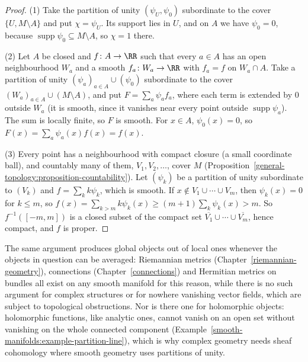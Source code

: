 \begin{proof}
(1) Take the partition of unity $(\psi_U, \psi_0)$ subordinate to the cover $\{U, M \setminus A\}$ and put $\chi = \psi_U$. Its support lies in $U$, and on $A$
we have $\psi_0 = 0$, because $\operatorname{supp}\psi_0 \subseteq M \setminus A$, so $\chi = 1$ there.

(2) Let $A$ be closed and $f \colon A \to \RR$ such that every $a \in A$ has an open neighbourhood $W_a$ and a smooth $f_a \colon W_a \to \RR$ with $f_a = f$ on
$W_a \cap A$. Take a partition of unity $(\psi_a)_{a \in A} \cup (\psi_0)$ subordinate to the cover $(W_a)_{a \in A} \cup (M \setminus A)$, and put
$F = \sum_a\psi_af_a$, where each term is extended by $0$ outside $W_a$ (it is smooth, since it vanishes near every point outside $\operatorname{supp}\psi_a$).
The sum is locally finite, so $F$ is smooth. For $x \in A$, $\psi_0(x) = 0$, so $F(x) = \sum_a\psi_a(x)f(x) = f(x)$.

(3) Every point has a neighbourhood with compact closure (a small coordinate ball), and countably many of them, $V_1, V_2, \ldots$, cover $M$
(Proposition~\ref{general-topology:proposition-countability}). Let $(\psi_k)$ be a partition of unity subordinate to $(V_k)$ and $f = \sum_kk\psi_k$, which is
smooth. If $x \notin V_1 \cup \cdots \cup V_m$, then $\psi_k(x) = 0$ for $k \leq m$, so $f(x) = \sum_{k > m}k\psi_k(x) \geq (m + 1)\sum_k\psi_k(x) > m$. So
$f^{-1}([-m, m])$ is a closed subset of the compact set $\overline{V_1} \cup \cdots \cup \overline{V_m}$, hence compact, and $f$ is proper.
\end{proof}

\begin{remark}\label{smooth-manifolds:remark-patching}
The same argument produces global objects out of local ones whenever the objects in question can be averaged: Riemannian metrics (Chapter~\ref{riemannian-geometry}), connections
(Chapter~\ref{connections}) and Hermitian metrics on bundles all exist on any smooth manifold for this reason, while there is no such argument for complex structures or for nowhere vanishing vector fields,
which are subject to topological obstructions. Nor is there one for holomorphic objects: holomorphic functions, like analytic ones, cannot vanish on an open set
without vanishing on the whole connected component (Example~\ref{smooth-manifolds:example-partition-line}), which is why complex geometry needs sheaf
cohomology where smooth geometry uses partitions of unity.
\end{remark}

